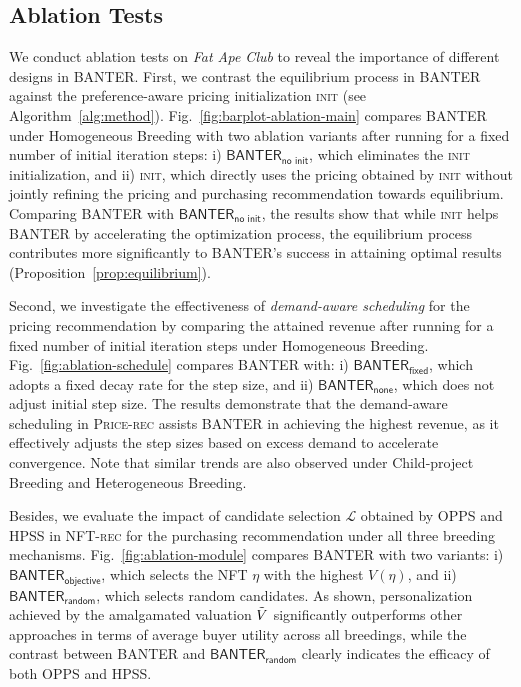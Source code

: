 \documentclass[conference]{IEEEtran}
\theoremstyle{plain}
\begin{document}
\subsection{Ablation Tests}
\label{subsec:ablation_tests}
We conduct ablation tests on \textit{Fat Ape Club} to reveal the importance of different designs in BANTER\xspace. First, we contrast the equilibrium process in \textsf{BANTER\xspace} against the preference-aware pricing initialization \textsc{init} (see Algorithm~\ref{alg:method}). Fig.~\ref{fig:barplot-ablation-main} compares \textsf{BANTER\xspace} under Homogeneous Breeding\xspace with two ablation variants after running for a fixed number of initial iteration steps: i) $\textsf{BANTER\xspace}_{\textsf{no init}}$, which eliminates the \textsc{init} initialization, and ii) \textsc{init}, which directly uses the pricing obtained by \textsc{init} without jointly refining the pricing and purchasing recommendation towards equilibrium. Comparing \textsf{BANTER\xspace} with $\textsf{BANTER\xspace}_{\textsf{no init}}$, the results show that while \textsc{init} helps \textsf{BANTER\xspace} by accelerating the optimization process, the equilibrium process contributes more significantly to \textsf{BANTER\xspace}'s success in attaining optimal results (Proposition~\ref{prop:equilibrium}). 

Second, we investigate the effectiveness of \textit{demand-aware scheduling} for the pricing recommendation by comparing the attained revenue after running for a fixed number of initial iteration steps under Homogeneous Breeding\xspace. Fig.~\ref{fig:ablation-schedule} compares \textsf{BANTER\xspace} with: i) $\textsf{BANTER\xspace}_{\textsf{fixed}}$, which adopts a fixed decay rate for the step size, and ii) $\textsf{BANTER\xspace}_{\textsf{none}}$, which does not adjust initial step size. The results demonstrate that the demand-aware scheduling in \textsc{Price-rec}\xspace assists \textsc{BANTER\xspace} in achieving the highest revenue, as it effectively adjusts the step sizes based on excess demand to accelerate convergence. Note that similar trends are also observed under Child-project Breeding\xspace and Heterogeneous Breeding\xspace. 

Besides, we evaluate the impact of candidate selection $\mathcal{L}$ obtained by OPPS\xspace and HPSS\xspace in \textsc{NFT-rec}\xspace for the purchasing recommendation under all three breeding mechanisms. Fig.~\ref{fig:ablation-module} compares \textsf{BANTER\xspace} with two variants: i) $\textsf{BANTER\xspace}_{\textsf{objective}}$, which selects the NFT $\eta$ with the highest $V(\eta)$, and ii) $\textsf{BANTER\xspace}_{\textsf{random}}$, which selects random candidates. As shown, personalization achieved by the amalgamated valuation $\Tilde{V}$ significantly outperforms other approaches in terms of average buyer utility across all breedings, while the contrast between \textsf{BANTER\xspace} and $\textsf{BANTER\xspace}_{\textsf{random}}$ clearly indicates the efficacy of both OPPS\xspace and HPSS\xspace.
\end{document}
